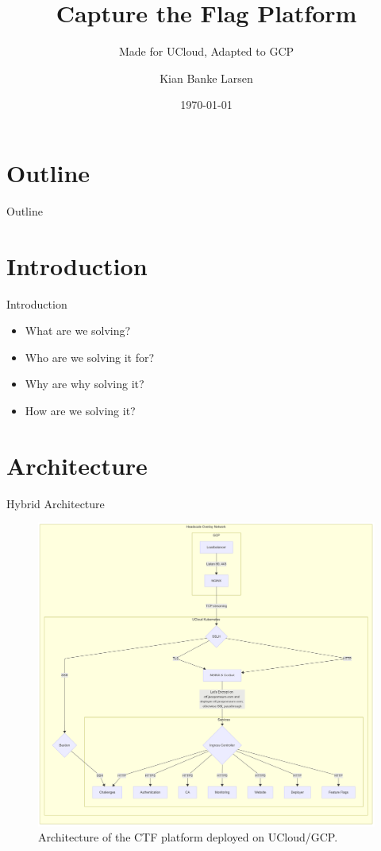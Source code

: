 \documentclass{beamer}
\title{Capture the Flag Platform}
\subtitle{Made for UCloud, Adapted to GCP\\ \vspace{17pt} \vspace{-10pt}}
\author[K. B. Larsen]{Kian Banke Larsen}
\institute{Southern University of Denmark}
\date{\today}
\begin{document}
\begin{frame}
\titlepage
\end{frame}

\section*{Outline}
\begin{frame}{Outline}
\tableofcontents
\end{frame}

\section{Introduction}
\begin{frame}{Introduction}
    \begin{itemize}
        \item What are we solving?
        \item Who are we solving it for?
        \item Why are why solving it?
        \item How are we solving it?
    \end{itemize}
\vspace*{\fill}
\end{frame}

\section{Architecture}
\begin{frame}{Hybrid Architecture}
    \begin{figure}
        \centering
        \includegraphics[width=.7\textwidth]{../report/images/ucloud-architecture.png}
        \caption{Architecture of the CTF platform deployed on UCloud/GCP.}
    \end{figure}
\end{frame}
\end{document}
